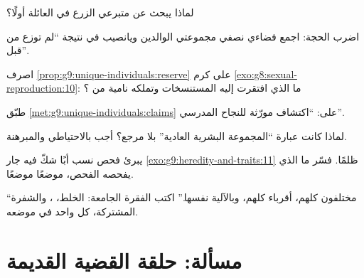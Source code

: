 \begin{exercise}[$\star$]\label{exo:g9:unique-individuals:6}
لماذا يبحث عن متبرعي الزرع في العائلة أولًا؟
\end{exercise}

\begin{exercise}[$\star\star$]\label{exo:g9:unique-individuals:7}
اضرب الحجة: اجمع فضاءي نصفي مجموعتي الوالدين ويانصيب
 في نتيجة ``لم توزع من قبل''.
\end{exercise}

\begin{exercise}[$\star\star$]\label{exo:g9:unique-individuals:8}
اصرف \cref{prop:g9:unique-individuals:reserve} على كرم
\cref{exo:g8:sexual-reproduction:10}: ما الذي افتقرت
إليه المستنسخات وتملكه  نامية من ؟
\end{exercise}

\begin{exercise}[$\star\star$]\label{exo:g9:unique-individuals:9}
طبّق \cref{met:g9:unique-individuals:claims} على:
``اكتشاف مورّثة للنجاح المدرسي''.
\end{exercise}

\begin{exercise}[$\star\star$]\label{exo:g9:unique-individuals:10}
لماذا كانت عبارة ``المجموعة البشرية العادية'' بلا مرجع؟
أجب بالاحتياطي والمبرهنة.
\end{exercise}

\begin{exercise}[$\star\star$]\label{exo:g9:unique-individuals:11}
يبرئ فحص نسب أبًا شكّ فيه جار
\cref{exo:g9:heredity-and-traits:11} ظلمًا. فسّر ما الذي
يفحصه الفحص، موضعًا موضعًا.
\end{exercise}

\begin{exercise}[$\star\star\star$]\label{exo:g9:unique-individuals:12}
``مختلفون كلهم، أقرباء كلهم، وبالآلية نفسها.'' اكتب
الفقرة الجامعة: الخلط، ، والشفرة المشتركة، كل
واحد في موضعه.
\end{exercise}

\section{مسألة: حلقة القضية القديمة}

